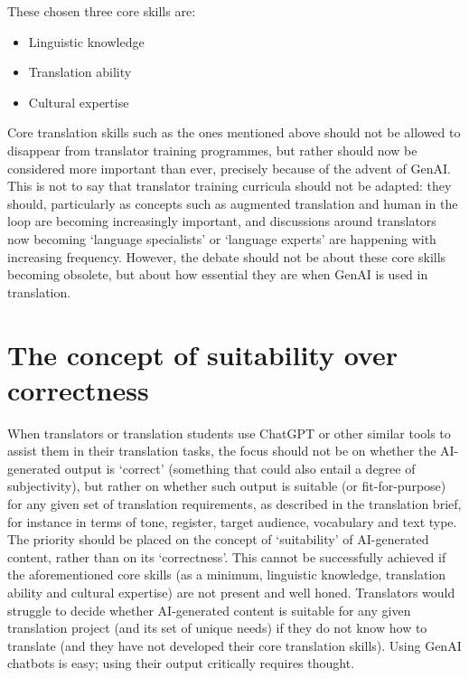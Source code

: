 \documentclass[output=paper]{langscibook}
\begin{document}
These chosen three core skills are:

\begin{itemize}
\item  Linguistic knowledge
\item  Translation ability
\item  Cultural expertise
\end{itemize}
Core translation skills such as the ones mentioned above should not be allowed to disappear from translator training programmes, but rather should now be considered more important than ever, precisely because of the advent of GenAI. This is not to say that translator training curricula should not be adapted: they should, particularly as concepts such as augmented translation and human in the loop are becoming increasingly important, and discussions around translators now becoming ‘language specialists’ or ‘language experts’ are happening with increasing frequency. However, the debate should not be about these core skills becoming obsolete, but about how essential they are when GenAI is used in translation.

\section{The concept of suitability over correctness}
When translators or translation students use ChatGPT or other similar tools to assist them in their translation tasks, the focus should not be on whether the AI-generated output is ‘correct’ (something that could also entail a degree of subjectivity), but rather on whether such output is suitable (or fit-for-purpose) for any given set of translation requirements, as described in the translation brief, for instance in terms of tone, register, target audience, vocabulary and text type. The priority should be placed on the concept of ‘suitability’ of AI-generated content, rather than on its ‘correctness’. This cannot be successfully achieved if the aforementioned core skills (as a minimum, linguistic knowledge, translation ability and cultural expertise) are not present and well honed. Translators would struggle to decide whether AI-generated content is suitable for any given translation project (and its set of unique needs) if they do not know how to translate (and they have not developed their core translation skills). Using GenAI chatbots is easy; using their output critically requires thought.
\end{document}
